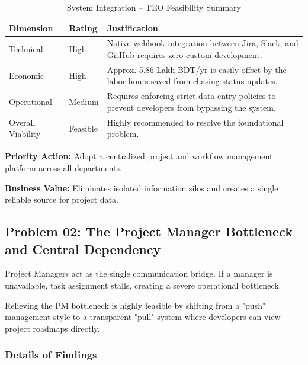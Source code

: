 \documentclass[12pt,a4paper]{report}
\begin{document}
\begin{table}[H]
\centering
\renewcommand{\arraystretch}{1.3}
\begin{tabularx}{\textwidth}{|p{3cm}|p{2.5cm}|X|}
\hline
\rowcolor{secondary}
\textbf{Dimension} & \textbf{Rating} & \textbf{Justification} \\
\hline
Technical & High & Native webhook integration between Jira, Slack, and GitHub requires zero custom development. \\
\hline
Economic & High & Approx. 5.86 Lakh BDT/yr is easily offset by the labor hours saved from chasing status updates. \\
\hline
Operational & Medium & Requires enforcing strict data-entry policies to prevent developers from bypassing the system. \\
\hline
Overall Viability & Feasible & Highly recommended to resolve the foundational problem. \\
\hline
\end{tabularx}
\caption{System Integration -- TEO Feasibility Summary}
\end{table}

\begin{recommendBox}
\textbf{Priority Action:} Adopt a centralized project and workflow management platform across all departments.

\textbf{Business Value:} Eliminates isolated information silos and creates a single reliable source for project data.
\end{recommendBox}

\subsection{Problem 02: The Project Manager Bottleneck and Central Dependency}

\begin{problemBox}
Project Managers act as the single communication bridge. If a manager is unavailable, task assignment stalls, creating a severe operational bottleneck.
\end{problemBox}

\begin{summaryBox}
Relieving the PM bottleneck is highly feasible by shifting from a "push" management style to a transparent "pull" system where developers can view project roadmaps directly.
\end{summaryBox}

\subsubsection{Details of Findings}
\end{document}
